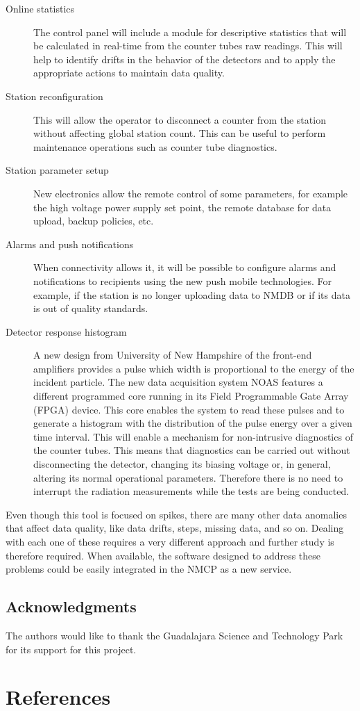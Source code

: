 \documentclass[a4paper]{jpconf}
\begin{document}
\begin{description}
    \item[Online statistics] The control panel will include a module for
        descriptive statistics that will be calculated in real-time from the
        counter tubes raw readings. This will help to identify drifts in the
        behavior of the detectors and to apply the appropriate actions to
        maintain data quality.
    \item[Station reconfiguration] This will allow the operator to disconnect a
        counter from the station without affecting global station count. This
        can be useful to perform maintenance operations such as counter tube
        diagnostics. 
    \item[Station parameter setup] New electronics allow the remote control of
        some parameters, for example the high voltage power supply set point,
        the remote database for data upload, backup policies, etc.
    \item[Alarms and push notifications] When connectivity allows it, it will
        be possible to configure alarms and notifications to recipients using
        the new push mobile technologies. For example, if the station is no
        longer uploading data to NMDB or if its data is out of quality
        standards.
    \item[Detector response histogram] A new design from University of New
        Hampshire of the front-end amplifiers provides a pulse which width is
        proportional to the energy of the incident particle. The new data
        acquisition system NOAS features a different programmed core running in
        its Field Programmable Gate Array (FPGA) device. This core enables the
        system to read these pulses and to generate a histogram with the
        distribution of the pulse energy over a given time interval. This will
        enable a mechanism for non-intrusive diagnostics of the counter tubes.
        This means that diagnostics can be carried out without disconnecting the
        detector, changing its biasing voltage or, in general, altering its
        normal operational parameters. Therefore there is no need to interrupt
        the radiation measurements while the tests are being conducted.
\end{description}

Even though this tool is focused on spikes, there are many other data anomalies
that affect data quality, like data drifts, steps, missing data, and so on.
Dealing with each one of these requires a very different approach and further
study is therefore required. When available, the software designed to address
these problems could be easily integrated in the NMCP as a new service.

\subsection*{Acknowledgments} 

The authors would like to thank the Guadalajara Science and Technology Park for
its support for this project.


\section*{References}
 
\end{document}
